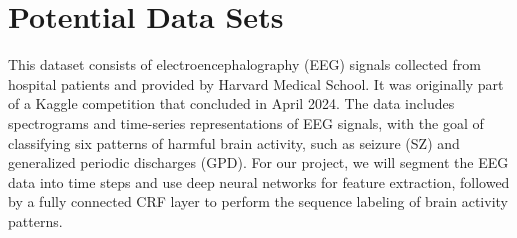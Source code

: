 \documentclass[12pt]{article}
\begin{document}
\citet{fan2023environment}


\section{Potential Data Sets}


This dataset consists of electroencephalography (EEG) signals collected from
hospital patients and provided by Harvard Medical School. It was originally
part of a Kaggle competition that concluded in April 2024. The data includes
spectrograms and time-series representations of EEG signals, with the goal of
classifying six patterns of harmful brain activity, such as seizure (SZ) and
generalized periodic discharges (GPD). For our project, we will segment the EEG
data into time steps and use deep neural networks for feature extraction,
followed by a fully connected CRF layer to perform the sequence labeling of
brain activity patterns.




\end{document}

